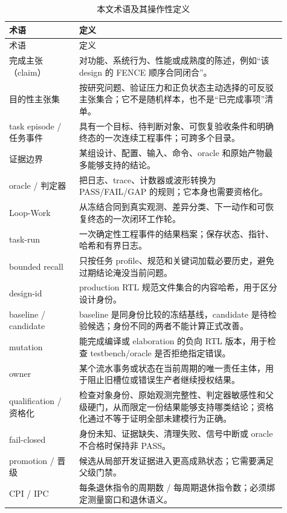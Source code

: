 \documentclass[UTF8,a4paper,zihao=-4,oneside]{ctexart}
\begin{document}
\begin{longtable}{@{}L{0.23\linewidth}L{0.68\linewidth}@{}}
  \caption{本文术语及其操作性定义}\label{tab:terms}\\
  \toprule
  术语 & 定义 \\
  \midrule
  \endfirsthead
  \toprule
  术语 & 定义 \\
  \midrule
  \endhead
  完成主张（claim） & 对功能、系统行为、性能或成熟度的陈述，例如“该 design 的 FENCE 顺序合同闭合”。 \\
  目的性主张集 & 按研究问题、验证压力和正负状态主动选择的可反驳主张集合；它不是随机样本，也不是“已完成事项”清单。 \\
  task episode / 任务事件 & 具有一个目标、待判断对象、可恢复验收条件和明确终态的一次连续工程事件；可跨多个目录。 \\
  证据边界 & 某组设计、配置、输入、命令、oracle 和原始产物最多能够支持的结论。 \\
  oracle / 判定器 & 把日志、trace、计数器或波形转换为 PASS/FAIL/GAP 的规则；它本身也需要资格化。 \\
  Loop-Work & 从冻结合同到真实观测、差异分类、下一动作和可恢复终态的一次闭环工作轮。 \\
  task-run & 一次确定性工程事件的结果档案；保存状态、指针、哈希和有界日志。 \\
  bounded recall & 只按任务 profile、规范和关键词加载必要历史，避免过期结论淹没当前问题。 \\
  design-id & production RTL 规范文件集合的内容哈希，用于区分设计身份。 \\
  baseline / candidate & baseline 是同身份比较的冻结基线，candidate 是待检验候选；身份不同的两者不能计算正式改善。 \\
  mutation & 能完成编译或 elaboration 的负向 RTL 版本，用于检查 testbench/oracle 是否拒绝指定错误。 \\
  owner & 某个流水事务或状态在当前周期的唯一责任主体，用于阻止旧槽位或错误生产者继续授权结果。 \\
  qualification / 资格化 & 检查对象身份、原始观测完整性、判定器敏感性和父级硬门，从而限定一份结果能够支持哪类结论；资格化通过不等于证明全部未建模行为正确。 \\
  fail-closed & 身份未知、证据缺失、清理失败、信号中断或 oracle 不合格时保持非 PASS。 \\
  promotion / 晋级 & 候选从局部开发证据进入更高成熟状态；它需要满足父级门禁。 \\
  CPI / IPC & 每条退休指令的周期数 / 每周期退休指令数；必须绑定测量窗口和退休语义。 \\

\end{longtable}
\end{document}
